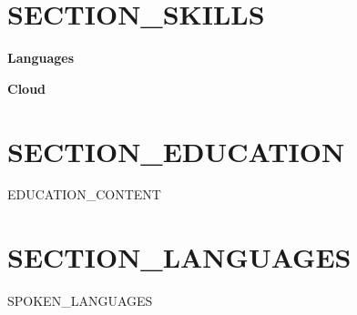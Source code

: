 \documentclass[10pt,a4paper]{article}
\begin{document}

\begin{minipage}[t]{0.63\textwidth}

\section*{{SECTION_SKILLS}}

\textbf{Languages}

\vspace{4pt}


\vspace{10pt}

\textbf{Cloud}

\vspace{4pt}


\end{minipage}
\hfill
\begin{minipage}[t]{0.33\textwidth}

\section*{{SECTION_EDUCATION}}

{{EDUCATION_CONTENT}}

\vspace{8pt}

\section*{{SECTION_LANGUAGES}}

{{SPOKEN_LANGUAGES}}

\end{minipage}
\end{document}
